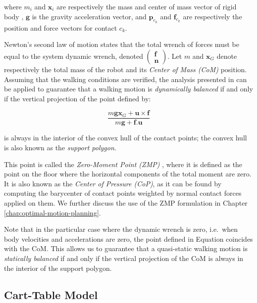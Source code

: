 \noindent where $m_i$ and $\mathbf{x}_i$ are respectively the mass and
center of mass vector of rigid body , $\mathbf{g}$ is the
gravity acceleration vector, and $\mathbf{p}_{c_k}$ and
$\mathbf{f}_{c_k}$ are respectively the position and force vectors for
contact $c_k$.

Newton's second law of motion states that the total wrench of forces
must be equal to the system dynamic wrench, denoted
$\left(\begin{matrix}\mathbf{f}\\\mathbf{n}\end{matrix}\right)$. Let
$m$ and $\mathbf{x}_G$ denote respectively the total mass of the robot
and its \emph{Center of Mass (CoM)} position. Assuming that the
walking conditions are verified, the analysis presented in
\cite{wieber2002} can be applied to guarantee that a walking motion is
\emph{dynamically balanced} if and only if the vertical projection of
the point defined by:

\begin{equation}
\label{eq:chap1-dynamic-balance}
  \frac{m\mathbf{g}\mathbf{x}_G +
    \mathbf{u}\times\mathbf{f}}{m\mathbf{g} + \mathbf{f}.\mathbf{u}}
\end{equation}

\noindent is always in the interior of the convex hull of the contact points;
the convex hull is also known as the \emph{support polygon}.

This point is called the \emph{Zero-Moment Point (ZMP)}
\cite{vukobratovic1969contribution}, where it is defined as the point
on the floor where the horizontal components of the total moment are
zero. It is also known as the \emph{Center of Pressure (CoP)}, as it
can be found by computing the barycenter of contact points weighted by
normal contact forces applied on them. We further discuss the use of
the ZMP formulation in Chapter \ref{chap:optimal-motion-planning}.

Note that in the particular case where the dynamic wrench is zero,
i.e.\ when body velocities and accelerations are zero, the point
defined in Equation  coincides with
the CoM. This allows us to guarantee that a quasi-static walking
motion is \emph{statically balanced} if and only if the vertical
projection of the CoM is always in the interior of the support
polygon.

\subsection{Cart-Table Model}
\label{subsec:chap1-cart-table}

